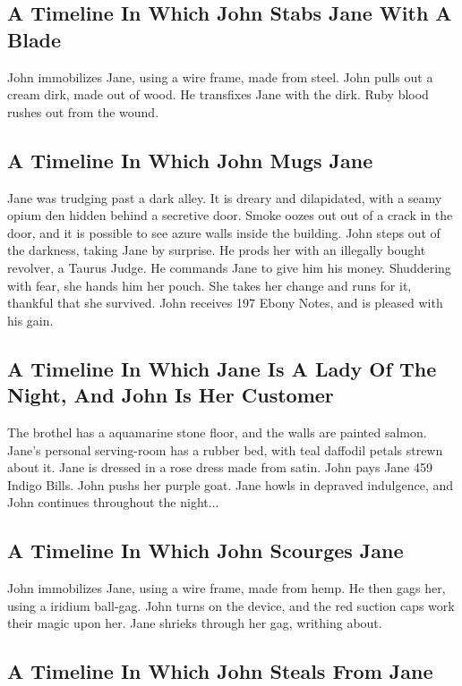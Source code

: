 \documentclass{article}
\begin{document}
\subsection{A Timeline In Which John Stabs Jane With A Blade}


John immobilizes Jane, using a wire frame, made from steel.
John pulls out a cream dirk, made out of wood.
He transfixes Jane with the dirk.
Ruby blood rushes out from the wound.
\subsection{A Timeline In Which John Mugs Jane}


Jane was trudging past a dark alley.
It is dreary and dilapidated, with a seamy opium den hidden behind a secretive door.
Smoke oozes out out of a crack in the door, and it is possible to see azure walls inside the building.
John steps out of the darkness, taking Jane by surprise.
He prods her with an illegally bought revolver, a Taurus Judge.
He commands Jane to give him his money.
Shuddering with fear, she hands him her pouch.
She takes her change and runs for it, thankful that she survived.
John receives 197 Ebony Notes, and is pleased with his gain.
\subsection{A Timeline In Which Jane Is A Lady Of The Night, And John Is Her Customer}


The brothel has a aquamarine stone floor, and the walls are painted salmon.
Jane's personal serving{-}room has a rubber bed, with teal daffodil petals strewn about it.
Jane is dressed in a rose dress made from satin.
John pays Jane 459 Indigo Bills.
John pushs her purple goat.
Jane howls in depraved indulgence, and John continues throughout the night...
\subsection{A Timeline In Which John Scourges Jane}


John immobilizes Jane, using a wire frame, made from hemp.
He then gags her, using a iridium ball{-}gag.
John turns on the device, and the red suction caps work their magic upon her.
Jane shrieks through her gag, writhing about.
\subsection{A Timeline In Which John Steals From Jane}
\end{document}

